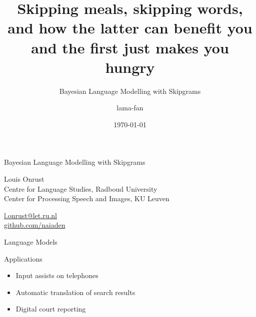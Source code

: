 \documentclass[department=cls, notes={hide notes}, official=true]{beamerruhuisstijl}
\title{Skipping meals, skipping words, and how the latter can benefit you and the first just makes you hungry}
\subtitle{Bayesian Language Modelling with Skipgrams}
\date{\today}
\author{lama-fan}
\begin{document}
\begin{frame}
    \titlepage
\end{frame}
\note{

}

\begin{frame}{Bayesian Language Modelling with Skipgrams}
    \begin{block}{}
        Louis Onrust \\
        Centre for Language Studies, Radboud University \\
        Center for Processing Speech and Images, KU Leuven
    \end{block}

    \begin{block}{}
        \href{mailto:l.onrust@let.ru.nl}{l.onrust@let.ru.nl} \\
        \href{https://github.com/naiaden}{github.com/naiaden}
    \end{block}
\end{frame}
\note[itemize]{
}

\begin{frame}{Language Models}
	\begin{block}{Applications}
    	\begin{itemize}
        	\item Input assists on telephones
            \item Automatic translation of search results
            \item Digital court reporting
        \end{itemize}
    \end{block}
    
\end{frame}
\note{

}
\end{document}
